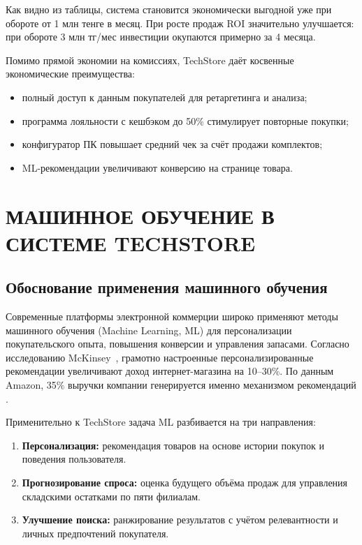 \documentclass[14pt,a4paper]{extreport}
\begin{document}
Как видно из таблицы, система становится экономически выгодной уже при обороте от 1 млн тенге в месяц. При росте продаж ROI значительно улучшается: при обороте 3 млн тг/мес инвестиции окупаются примерно за 4 месяца.

Помимо прямой экономии на комиссиях, TechStore даёт косвенные экономические преимущества:
\begin{itemize}
  \item полный доступ к данным покупателей для ретаргетинга и анализа;
  \item программа лояльности с кешбэком до 50\% стимулирует повторные покупки;
  \item конфигуратор ПК повышает средний чек за счёт продажи комплектов;
  \item ML-рекомендации увеличивают конверсию на странице товара.
\end{itemize}

\chapter{МАШИННОЕ ОБУЧЕНИЕ В СИСТЕМЕ TECHSTORE}

\section{Обоснование применения машинного обучения}

Современные платформы электронной коммерции широко применяют методы машинного обучения (Machine Learning, ML) для персонализации покупательского опыта, повышения конверсии и управления запасами. Согласно исследованию McKinsey~\cite{mckinsey2023}, грамотно настроенные персонализированные рекомендации увеличивают доход интернет-магазина на 10--30\%. По данным Amazon, 35\% выручки компании генерируется именно механизмом рекомендаций \cite{linden2003}.

Применительно к TechStore задача ML разбивается на три направления:
\begin{enumerate}
  \item \textbf{Персонализация:} рекомендация товаров на основе истории покупок и поведения пользователя.
  \item \textbf{Прогнозирование спроса:} оценка будущего объёма продаж для управления складскими остатками по пяти филиалам.
  \item \textbf{Улучшение поиска:} ранжирование результатов с учётом релевантности и личных предпочтений покупателя.
\end{enumerate}
\end{document}
